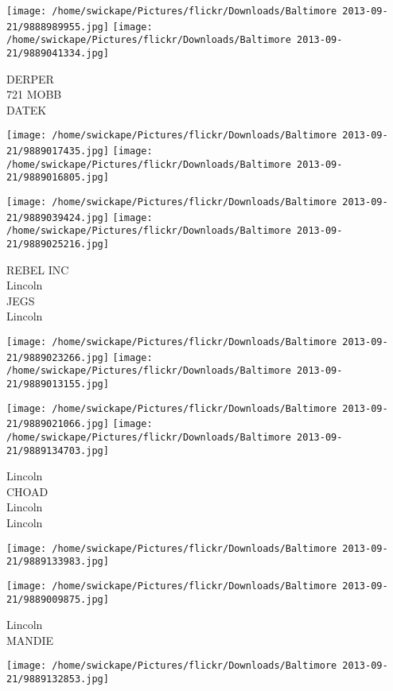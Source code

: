 \documentclass[10pt,letterpaper]{article}
\begin{document}
\vspace{0.25in}
\texttt{[image: /home/swickape/Pictures/flickr/Downloads/Baltimore 2013-09-21/9888989955.jpg]}
\texttt{[image: /home/swickape/Pictures/flickr/Downloads/Baltimore 2013-09-21/9889041334.jpg]}

DERPER\\
721 MOBB\\
DATEK\\
\pagebreak

\texttt{[image: /home/swickape/Pictures/flickr/Downloads/Baltimore 2013-09-21/9889017435.jpg]}
\texttt{[image: /home/swickape/Pictures/flickr/Downloads/Baltimore 2013-09-21/9889016805.jpg]}

\texttt{[image: /home/swickape/Pictures/flickr/Downloads/Baltimore 2013-09-21/9889039424.jpg]}
\texttt{[image: /home/swickape/Pictures/flickr/Downloads/Baltimore 2013-09-21/9889025216.jpg]}

REBEL INC\\
Lincoln\\
JEGS\\
Lincoln\\
\pagebreak

\texttt{[image: /home/swickape/Pictures/flickr/Downloads/Baltimore 2013-09-21/9889023266.jpg]}
\texttt{[image: /home/swickape/Pictures/flickr/Downloads/Baltimore 2013-09-21/9889013155.jpg]}

\texttt{[image: /home/swickape/Pictures/flickr/Downloads/Baltimore 2013-09-21/9889021066.jpg]}
\texttt{[image: /home/swickape/Pictures/flickr/Downloads/Baltimore 2013-09-21/9889134703.jpg]}

Lincoln\\
CHOAD\\
Lincoln\\
Lincoln\\
\pagebreak

\texttt{[image: /home/swickape/Pictures/flickr/Downloads/Baltimore 2013-09-21/9889133983.jpg]}

\vspace{0.25in}
\texttt{[image: /home/swickape/Pictures/flickr/Downloads/Baltimore 2013-09-21/9889009875.jpg]}

Lincoln\\
MANDIE\\
\pagebreak

\texttt{[image: /home/swickape/Pictures/flickr/Downloads/Baltimore 2013-09-21/9889132853.jpg]}
\end{document}
